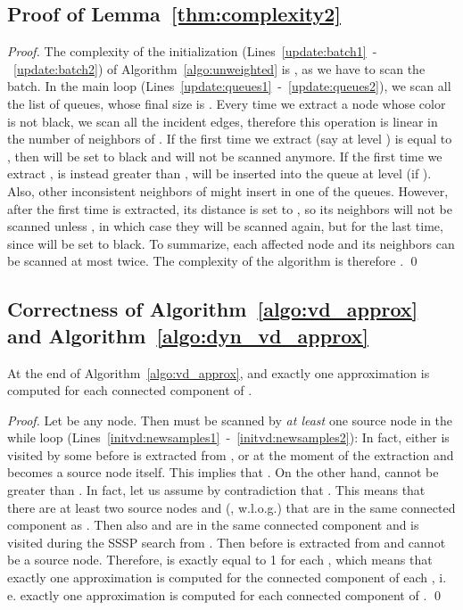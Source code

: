 \documentclass[english]{llncs}
\newcommand{\ie}{i.\,e.\xspace}
\newcommand{\vd}{\xspace}
\begin{document}
\subsection{Proof of Lemma~\ref{thm:complexity2}}
\label{sub:proof_complexity2}
\begin{proof}
The complexity of the initialization (Lines~\ref{update:batch1}~-~\ref{update:batch2}) of Algorithm~\ref{algo:unweighted}
is , as we have to scan the batch. In the main loop (Lines~\ref{update:queues1}~-~\ref{update:queues2}), we scan all the list
of queues, whose final size is . 
Every time we extract a node  whose color is not black, we scan all the 
incident edges, therefore this operation is linear in the number of neighbors of . 
If the first time we extract  (say at level )  is equal to , then  will be set to black and will not be scanned anymore.
If the first time we extract ,  is instead greater than ,  will be inserted into the queue at level  (if ). 
Also, other inconsistent neighbors of  might insert  in one of the queues. However, after the first time  is extracted,
its distance is set to , so its neighbors will not be scanned unless , in which case 
they will be scanned again, but for the last time, since  will be set to black. To summarize, each affected node and its neighbors can 
be scanned at most twice. The complexity of the
algorithm is therefore . \qed
\end{proof}

\subsection{Correctness of Algorithm~\ref{algo:vd_approx} and Algorithm~\ref{algo:dyn_vd_approx}}
\begin{lemma}
\label{thm:vd_correctness}
At the end of Algorithm~\ref{algo:vd_approx},  and exactly one \vd approximation is computed for each connected component of .
\end{lemma}
\begin{proof}
Let  be any node. Then  must be scanned by \emph{at least} one source node  in the while loop (Lines~\ref{initvd:newsamples1}~-~\ref{initvd:newsamples2}): In fact, either  is visited by some  before  is extracted from , or  at the moment of the extraction and  becomes a source node itself. This implies that .
On the other hand,  cannot be greater than . In fact, let us assume by contradiction that . This means that there are at least two source nodes  and  (, w.l.o.g.) that are in the same connected component as . Then also  and  are in the same connected component and  is visited during the SSSP search from . Then  before  is extracted from  and  cannot be a source node.
Therefore,  is exactly equal to 1 for each , which means that exactly one \vd approximation is computed for the connected component of each , \ie exactly one \vd approximation is computed for each connected component of .
 \qed
\end{proof}
\end{document}

